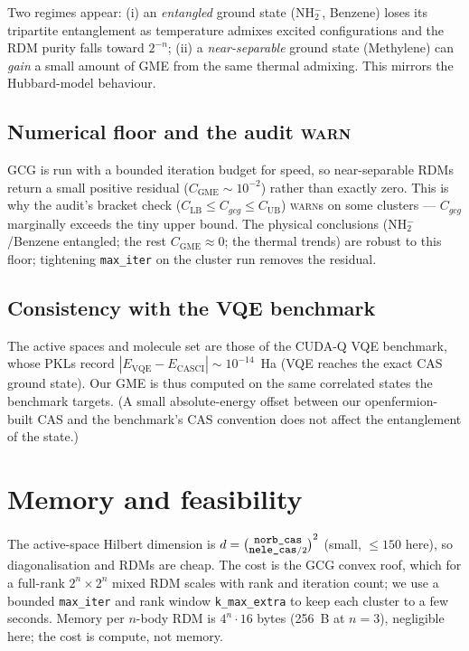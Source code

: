 \documentclass[11pt]{article}
\newcommand{\code}[1]{\texttt{\small #1}}
\newcommand{\CGME}{\ensuremath{C_{\mathrm{GME}}}}
\begin{document}
\noindent Two regimes appear: (i) an \emph{entangled} ground state (NH$_2^-$,
Benzene) loses its tripartite entanglement as temperature admixes excited
configurations and the RDM purity falls toward $2^{-n}$; (ii) a
\emph{near-separable} ground state (Methylene) can \emph{gain} a small amount of
GME from the same thermal admixing. This mirrors the Hubbard-model behaviour.

\subsection{Numerical floor and the audit \textsc{warn}}
GCG is run with a bounded iteration budget for speed, so near-separable RDMs
return a small positive residual ($\CGME\sim10^{-2}$) rather than exactly zero.
This is why the audit's bracket check ($C_{\mathrm{LB}}\le C_{gcg}\le C_{\mathrm{UB}}$)
\textsc{warn}s on some clusters --- $C_{gcg}$ marginally exceeds the tiny upper
bound. The physical conclusions (NH$_2^-$/Benzene entangled; the rest
$\CGME\approx0$; the thermal trends) are robust to this floor; tightening
\code{max\_iter} on the cluster run removes the residual.

\subsection{Consistency with the VQE benchmark}
The active spaces and molecule set are those of the CUDA-Q VQE benchmark, whose
PKLs record $|E_{\mathrm{VQE}}-E_{\mathrm{CASCI}}|\sim10^{-14}$~Ha (VQE reaches
the exact CAS ground state). Our GME is thus computed on the same correlated
states the benchmark targets. (A small absolute-energy offset between our
openfermion-built CAS and the benchmark's CAS convention does not affect the
entanglement of the state.)

\section{Memory and feasibility}
The active-space Hilbert dimension is $d=\binom{\code{norb\_cas}}
{\code{nele\_cas}/2}^2$ (small, $\le150$ here), so diagonalisation and RDMs are
cheap. The cost is the GCG convex roof, which for a full-rank $2^n\times2^n$
mixed RDM scales with rank and iteration count; we use a bounded
\code{max\_iter} and rank window \code{k\_max\_extra} to keep each cluster to a
few seconds. Memory per $n$-body RDM is $4^n\cdot16$ bytes (256~B at $n=3$),
negligible here; the cost is compute, not memory.
\end{document}
